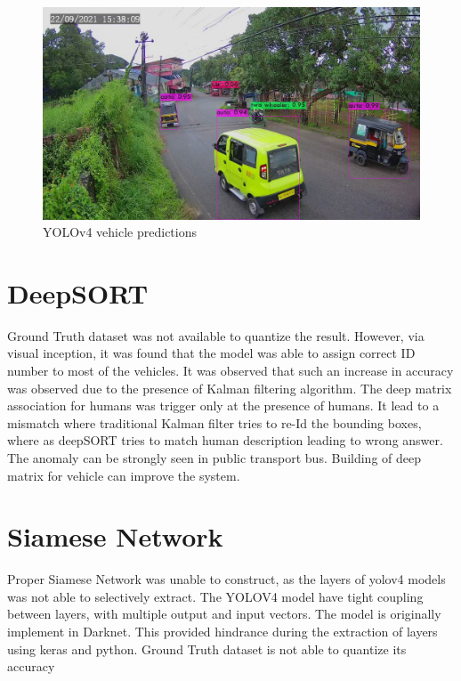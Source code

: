 \begin{figure}[ht!]
	\centering
	\includegraphics[width=0.8\linewidth]{Images/predictions}
	\caption{YOLOv4 vehicle predictions}
\end{figure}



\section{DeepSORT}
Ground Truth dataset was not available to quantize the result. However, via visual inception, it was found that the model was able to assign correct ID number to most of the vehicles. It was observed that such an increase in accuracy was observed due to the presence of Kalman filtering algorithm. The deep matrix association for humans was trigger only at the presence of humans. It lead to a mismatch where traditional Kalman filter tries to re-Id the bounding boxes, where as deepSORT tries to match human description leading to wrong answer. The anomaly can be strongly seen in public transport bus. Building of deep matrix for vehicle can improve the system.

\section{Siamese Network}
Proper Siamese Network was unable to construct, as the layers of yolov4 models was not able to selectively extract. The YOLOV4 model have tight coupling between layers, with multiple output and input vectors. The model is originally implement in Darknet.  This provided hindrance during the extraction of layers using keras and python. Ground Truth dataset is not able to quantize its accuracy



